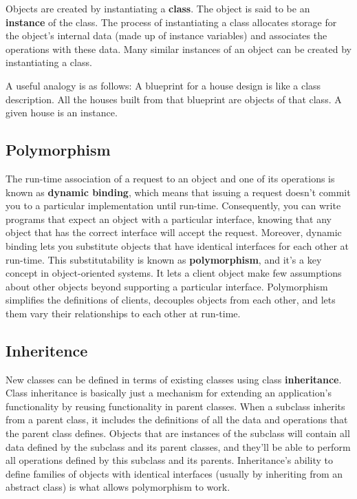 \documentclass{article}
\begin{document}
Objects are created by instantiating a \textbf{class}. The object is said to be an \textbf{instance} of the class. The process of instantiating a class allocates storage for the object's internal data (made up of instance variables) and associates the operations with these data. Many similar instances of an object can be created by instantiating a class.

A useful analogy is as follows: A blueprint for a house design is like a class description. All the houses built from that blueprint are objects of that class. A given house is an instance.

\subsection{Polymorphism}

The run-time association of a request to an object and one of its operations is known as \textbf{dynamic binding}, which means that issuing a request doesn't commit you to a particular implementation until run-time. Consequently, you can write programs that expect an object with a particular interface, knowing that any object that has the correct interface will accept the request. Moreover, dynamic binding lets you substitute objects that have identical interfaces for each other at run-time. This substitutability is known as \textbf{polymorphism}, and it's a key concept in object-oriented systems. It lets a client object make few assumptions about other objects beyond supporting a particular interface. Polymorphism simplifies the definitions of clients, decouples objects from each other, and lets them vary their relationships to each other at run-time.

\subsection{Inheritence}

New classes can be defined in terms of existing classes using class \textbf{inheritance}. Class inheritance is basically just a mechanism for extending an application's functionality by reusing functionality in parent classes. When a subclass inherits from a parent class, it includes the definitions of all the data and operations that the parent class defines. Objects that are instances of the subclass will contain all data defined by the subclass and its parent classes, and they'll be able to perform all operations defined by this subclass and its parents. Inheritance's ability to define
families of objects with identical interfaces (usually by inheriting from an abstract class) is what allows polymorphism to work. 
\end{document}
